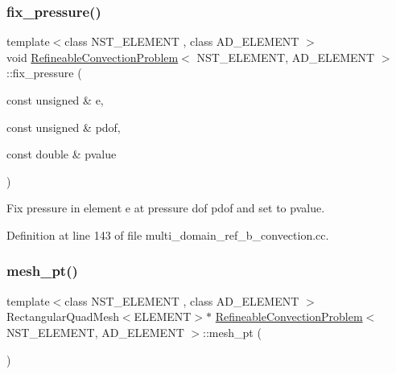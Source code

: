 \subsubsection{\texorpdfstring{fix\+\_\+pressure()}{fix\_pressure()}\hspace{0.1cm}{\footnotesize\ttfamily [2/2]}}
{\footnotesize\ttfamily template$<$class N\+S\+T\+\_\+\+E\+L\+E\+M\+E\+NT , class A\+D\+\_\+\+E\+L\+E\+M\+E\+NT $>$ \\
void \hyperlink{classRefineableConvectionProblem}{Refineable\+Convection\+Problem}$<$ N\+S\+T\+\_\+\+E\+L\+E\+M\+E\+NT, A\+D\+\_\+\+E\+L\+E\+M\+E\+NT $>$\+::fix\+\_\+pressure (\begin{DoxyParamCaption}\item[{const unsigned \&}]{e,  }\item[{const unsigned \&}]{pdof,  }\item[{const double \&}]{pvalue }\end{DoxyParamCaption})\hspace{0.3cm}{\ttfamily [inline]}}



Fix pressure in element e at pressure dof pdof and set to pvalue. 



Definition at line 143 of file multi\+\_\+domain\+\_\+ref\+\_\+b\+\_\+convection.\+cc.

\mbox{\label{classRefineableConvectionProblem_a837d2412cee6996c78a2d2c5adf720f3}} 
\subsubsection{\texorpdfstring{mesh\+\_\+pt()}{mesh\_pt()}}
{\footnotesize\ttfamily template$<$class N\+S\+T\+\_\+\+E\+L\+E\+M\+E\+NT , class A\+D\+\_\+\+E\+L\+E\+M\+E\+NT $>$ \\
Rectangular\+Quad\+Mesh$<$E\+L\+E\+M\+E\+NT$>$$\ast$ \hyperlink{classRefineableConvectionProblem}{Refineable\+Convection\+Problem}$<$ N\+S\+T\+\_\+\+E\+L\+E\+M\+E\+NT, A\+D\+\_\+\+E\+L\+E\+M\+E\+NT $>$\+::mesh\+\_\+pt (\begin{DoxyParamCaption}{ }\end{DoxyParamCaption})\hspace{0.3cm}{\ttfamily [inline]}}



